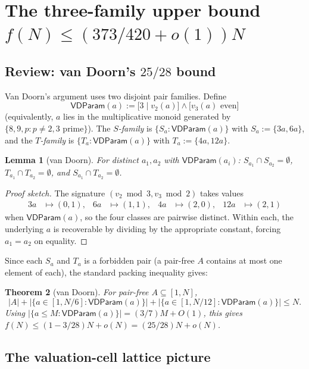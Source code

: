 \documentclass[11pt]{amsart}
\theoremstyle{plain}
\newtheorem{theorem}{Theorem}[section]
\newtheorem{lemma}[theorem]{Lemma}
\theoremstyle{definition}
\newcommand{\vdp}{\mathsf{VDParam}}
\begin{document}
\section{The three-family upper bound $f(N) \leq (373/420 + o(1)) N$}\label{sec:upper}

\subsection{Review: van Doorn's $25/28$ bound}

Van Doorn's argument uses two disjoint pair families. Define
\[
  \vdp(a) := \bigl[3 \mid v_2(a)\bigr] \wedge \bigl[v_3(a) \text{ even}\bigr]
\]
(equivalently, $a$ lies in the multiplicative monoid generated by $\{8, 9, p : p \neq 2, 3 \text{ prime}\}$). The \emph{$S$-family} is $\{S_a : \vdp(a)\}$ with $S_a := \{3a, 6a\}$, and the \emph{$T$-family} is $\{T_a : \vdp(a)\}$ with $T_a := \{4a, 12a\}$.

\begin{lemma}[van Doorn]\label{lem:vd-disjoint}
For distinct $a_1, a_2$ with $\vdp(a_i)$: $S_{a_1} \cap S_{a_2} = \emptyset$, $T_{a_1} \cap T_{a_2} = \emptyset$, and $S_{a_1} \cap T_{a_2} = \emptyset$.
\end{lemma}

\begin{proof}[Proof sketch]
The signature $(v_2 \bmod 3, v_3 \bmod 2)$ takes values
\begin{align*}
  3a &\mapsto (0, 1), & 6a &\mapsto (1, 1), & 4a &\mapsto (2, 0), & 12a &\mapsto (2, 1)
\end{align*}
when $\vdp(a)$, so the four classes are pairwise distinct. Within each, the underlying $a$ is recoverable by dividing by the appropriate constant, forcing $a_1 = a_2$ on equality.
\end{proof}

Since each $S_a$ and $T_a$ is a forbidden pair (a pair-free $A$ contains at most one element of each), the standard packing inequality gives:

\begin{theorem}[van Doorn]\label{thm:vd}
For pair-free $A \subseteq [1, N]$,
\[
  |A| + \bigl|\{a \in [1, N/6] : \vdp(a)\}\bigr| + \bigl|\{a \in [1, N/12] : \vdp(a)\}\bigr| \leq N.
\]
Using $|\{a \leq M : \vdp(a)\}| = (3/7) M + O(1)$, this gives $f(N) \leq (1 - 3/28) N + o(N) = (25/28) N + o(N)$.
\end{theorem}

\subsection{The valuation-cell lattice picture}
\end{document}
